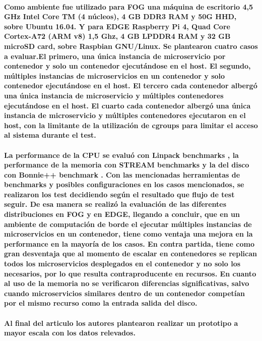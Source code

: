 \paragraph{
Como ambiente fue utilizado para FOG una máquina de escritorio 4,5 GHz Intel Core TM (4 núcleos),
4 GB DDR3 RAM y 50G HHD, sobre Ubuntu 16.04. Y para EDGE Raspberry Pi 4, Quad Core Cortex-A72 (ARM v8) 1,5 Ghz,
4 GB LPDDR4 RAM y 32 GB microSD card, sobre Raspbian GNU/Linux.
 Se plantearon cuatro casos a evaluar.El primero, una única instancia de microservicio por contenedor y solo un contenedor ejecutándose en el host. 
 El segundo, múltiples instancias de microservicios en un contenedor y solo contenedor ejecutándose en el host. El tercero cada contenedor albergó una única instancia de microservicio y múltiples contenedores ejecutándose en el host. El cuarto cada contenedor albergó una única instancia de microservicio y múltiples contenedores ejecutaron en el host, con la limitante de la utilización de cgroups para limitar el acceso al sistema durante el test.
}

\paragraph{
 La performance de la CPU se evaluó con Linpack benchmarks 
\cite{LINPACKBenchmarksWikipedia}, la performance de la memoria con STREAM benchmarks 
\cite{STREAMBenchmarkAMD} 
y la del disco con Bonnie++ benchmark \cite{BonnieWikipedia}.
 Con las mencionadas herramientas de benchmarks y posibles configuraciones en los casos mencionados,
 se realizaron los test decidiendo según el resultado que flujo de test seguir.
 De esa manera se realizó la evaluación de las diferentes distribuciones en FOG y en EDGE, llegando a concluir, que en un ambiente de computación de borde el ejecutar múltiples instancias de microservicios en un contenedor,
 tiene como ventaja una mejora en la performance en la mayoría de los casos.
 En contra partida, tiene como gran desventaja que al momento de escalar en contenedores se replican todos los microservicios desplegados en el contenedor
 y no solo los necesarios, por lo que resulta contraproducente en recursos. 
 En cuanto al uso de la memoria no se verificaron diferencias significativas, 
 salvo cuando microservicios similares dentro de un contenedor competían por el mismo recurso como la entrada salida del disco.
}

\paragraph{
  Al final del articulo los autores plantearon realizar un prototipo a mayor escala con los datos relevados.
 }